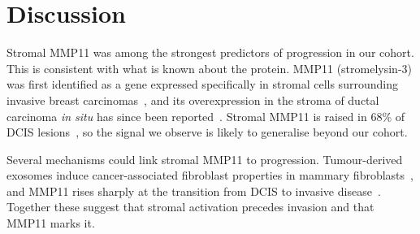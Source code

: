 \section{Discussion}

Stromal MMP11 was among the strongest predictors of progression in our
cohort. This is consistent with what is known about the protein. MMP11
(stromelysin-3) was first identified as a gene expressed specifically in
stromal cells surrounding invasive breast carcinomas~\cite{basset1990}, and
its overexpression in the stroma of ductal carcinoma \emph{in situ} has since
been reported~\cite{moreau2012}. Stromal MMP11 is raised in 68\% of DCIS
lesions~\cite{stats2026}, so the signal we observe is likely to generalise
beyond our cohort.

Several mechanisms could link stromal MMP11 to progression. Tumour-derived
exosomes induce cancer-associated fibroblast properties in mammary
fibroblasts~\cite{zhu2022}, and MMP11 rises sharply at the transition from
DCIS to invasive disease~\cite{laurent2017}. Together these suggest that
stromal activation precedes invasion and that MMP11 marks it.




